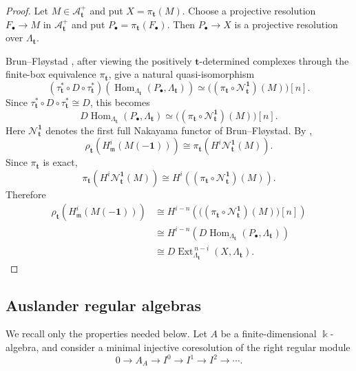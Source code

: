 \documentclass[10pt,a4paper]{amsart}
\newcommand{\Hom}{\operatorname{Hom}}
\newcommand{\Ext}{\operatorname{Ext}}
\begin{document}
\begin{proof}
Let $M\in\mathcal A^+_{\mathbf t}$ and put $X=\pi_{\mathbf t}(M).$
Choose a projective resolution $F_\bullet\to M$ in
$\mathcal A^+_{\mathbf t}$ and put $P_\bullet=\pi_{\mathbf t}(F_\bullet).$
Then $P_\bullet\to X$ is a projective resolution over
$\Lambda_{\mathbf t}$.

Brun--Fl\o ystad \cite[Proposition~3.9]{BF}, after viewing the
positively $\mathbf t$-determined complexes through the finite-box
equivalence $\pi_{\mathbf t}$, give a natural quasi-isomorphism
\[
(\tau_{\mathbf t}^*\circ D\circ\tau_{\mathbf t}^*)\!\left(
\Hom_{\Lambda_{\mathbf t}}(P_\bullet,\Lambda_{\mathbf t})
\right)
\simeq
\bigl((\pi_{\mathbf t}\circ\mathcal N_{\mathbf t}^{\mathbf1})(M)\bigr)[n].
\]
Since $\tau_{\mathbf t}^*\circ D\circ\tau_{\mathbf t}^*\cong D$, this becomes
\[
D\Hom_{\Lambda_{\mathbf t}}
(P_\bullet,\Lambda_{\mathbf t})
\simeq
\bigl((\pi_{\mathbf t}\circ\mathcal N_{\mathbf t}^{\mathbf1})(M)\bigr)[n].
\]
Here $\mathcal N_{\mathbf t}^{\mathbf1}$ denotes the first full
Nakayama functor of Brun--Fl\o ystad.  By
\cite[Section~2.3]{BF},
\[
\rho_{\mathbf t}\!\left(
H^i_{\mathfrak m}(M(-\mathbf1))
\right)
\cong
\pi_{\mathbf t}\!\left(
H^i\mathcal N_{\mathbf t}^{\mathbf1}(M)
\right).
\]
Since $\pi_{\mathbf t}$ is exact,
\[
\pi_{\mathbf t}\!\left(
H^i\mathcal N_{\mathbf t}^{\mathbf1}(M)
\right)
\cong
H^i\!\left(
(\pi_{\mathbf t}\circ\mathcal N_{\mathbf t}^{\mathbf1})(M)
\right).
\]
Therefore
\[
\begin{aligned}
\rho_{\mathbf t}\!\left(
H^i_{\mathfrak m}(M(-\mathbf1))
\right)
&\cong
H^{i-n}\!\left(
\bigl((\pi_{\mathbf t}\circ\mathcal N_{\mathbf t}^{\mathbf1})(M)\bigr)[n]
\right)\\
&\cong
H^{i-n}\!\left(
D\Hom_{\Lambda_{\mathbf t}}
(P_\bullet,\Lambda_{\mathbf t})
\right)\\
&\cong
D\Ext_{\Lambda_{\mathbf t}}^{\,n-i}
(X,\Lambda_{\mathbf t}).
\end{aligned}
\]
\end{proof}

\subsection{Auslander regular algebras}

We recall only the properties needed below.  Let $A$ be a finite-dimensional $\Bbbk$-algebra, and consider a minimal injective coresolution of the right regular module
\[
0\longrightarrow A_A\longrightarrow I^0\longrightarrow I^1\longrightarrow I^2\longrightarrow\cdots.
\]
\end{document}
